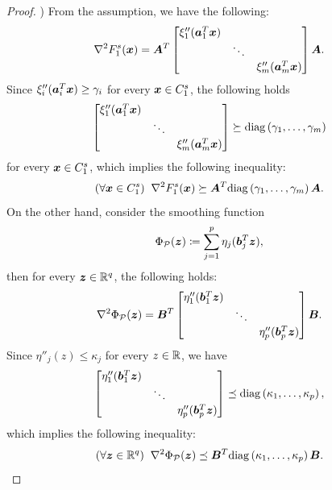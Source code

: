 \documentclass[lettersize,journal]{IEEEtran}
\theoremstyle{plain}%
\theoremstyle{definition}
\theoremstyle{remark}
\begin{document}
\begin{proof}
) From the assumption, we have the following:
\begin{equation*}
\nabla^2 F_1^s(\bm{x})=\bm{A}^T \begin{bmatrix}
\xi_1''(\bm{a}_1^T\bm{x}) & & \\
 &  \ddots & \\
 & & \xi_m''(\bm{a}_m^T\bm{x})
\end{bmatrix}
\bm{A}.
\end{equation*}
Since $\xi_i''(\bm{a}_i^T\bm{x})\geq \gamma_i$ for every $\bm{x}\in C_1^s$, the following holds
\begin{equation*}
\begin{bmatrix}
\xi_1''(\bm{a}_1^T\bm{x}) & &  \\
 & \ddots & \\
 & & \xi_m''(\bm{a}_m^T\bm{x})
\end{bmatrix}\succeq
\mathrm{diag}\left( \gamma_1,\dots,\gamma_m \right )
\end{equation*}
for every $\bm{x}\in C_1^s$, which implies the following inequality:
\begin{equation}\label{eq:hessian_F1s_geq_AtA}
(\forall \bm{x}\in C_1^s)\;\;\nabla^2 F_1^s(\bm{x})\succeq \bm{A}^T\mathrm{diag}\left( \gamma_1,\dots,\gamma_m \right )\bm{A}.
\end{equation}
On the other hand, consider the smoothing function \[\Phi_{\mathcal{P}}(\bm{z})\coloneqq \sum_{j=1}^p\eta_j(\bm{b}_j^T\bm{z}),\]
then for every $\bm{z}\in\mathbb{R}^q$, the following holds:
\begin{equation*}
\nabla^2\Phi_{\mathcal{P}}(\bm{z})=\bm{B}^T \begin{bmatrix}
\eta_1''(\bm{b}_1^T\bm{z}) & & \\
 & \ddots & \\
 & & \eta_p''(\bm{b}_p^T\bm{z})
\end{bmatrix}
\bm{B}.
\end{equation*} 
Since $\eta''_j(z)\leq \kappa_j$ for every $z\in\mathbb{R}$, we have
\begin{equation*}
\begin{bmatrix}
\eta_1''(\bm{b}_1^T\bm{z}) & & \\
 & \ddots & \\
 & & \eta_p''(\bm{b}_p^T\bm{z})
\end{bmatrix}\preceq \mathrm{diag}\left( \kappa_1,\dots, \kappa_p \right ),
\end{equation*}
which implies the following inequality:
\begin{equation*}
(\forall \bm{z}\in\mathbb{R}^q)\;\; \nabla^2 \Phi_{\mathcal{P}}(\bm{z})\preceq \bm{B}^T\mathrm{diag}\left( \kappa_1,\dots,\kappa_p \right )\bm{B}.
\end{equation*}

\end{proof}
\end{document}

